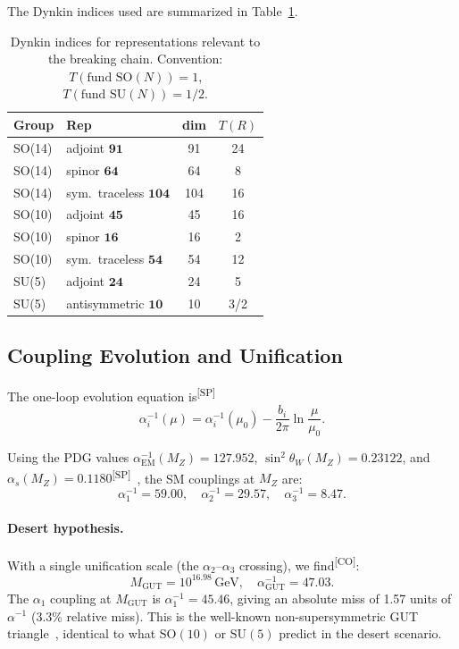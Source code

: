 \documentclass[aps,prd,twocolumn,showpacs,preprintnumbers,superscriptaddress,floatfix]{revtex4-2}
\newcommand{\GeV}{\,\mathrm{GeV}}
\newcommand{\CO}{\textsuperscript{[CO]}}
\newcommand{\SP}{\textsuperscript{[SP]}}
\begin{document}
The Dynkin indices used are summarized in Table~\ref{tab:dynkin}.

\begin{table}[b]
\centering
\caption{Dynkin indices for representations relevant to the breaking chain.
  Convention: $T(\text{fund SO}(N)) = 1$, $T(\text{fund SU}(N)) = 1/2$.}
\label{tab:dynkin}
\small
\begin{tabular}{@{}llcc@{}}
\toprule
\textbf{Group} & \textbf{Rep} & \textbf{dim} & $T(R)$ \\
\midrule
SO(14) & adjoint $\mathbf{91}$ & 91 & 24 \\
SO(14) & spinor $\mathbf{64}$ & 64 & 8 \\
SO(14) & sym.\ traceless $\mathbf{104}$ & 104 & 16 \\
SO(10) & adjoint $\mathbf{45}$ & 45 & 16 \\
SO(10) & spinor $\mathbf{16}$ & 16 & 2 \\
SO(10) & sym.\ traceless $\mathbf{54}$ & 54 & 12 \\
SU(5) & adjoint $\mathbf{24}$ & 24 & 5 \\
SU(5) & antisymmetric $\mathbf{10}$ & 10 & 3/2 \\
\bottomrule
\end{tabular}
\end{table}

\subsection{Coupling Evolution and Unification}

The one-loop evolution equation is\SP
\begin{equation}\label{eq:evolution}
  \alpha_i^{-1}(\mu) = \alpha_i^{-1}(\mu_0)
    - \frac{b_i}{2\pi} \ln\frac{\mu}{\mu_0}.
\end{equation}

Using the PDG values $\alpha_\text{EM}^{-1}(M_Z) = 127.952$,
$\sin^2\theta_W(M_Z) = 0.23122$, and $\alpha_s(M_Z) = 0.1180$\SP\
\cite{pdg2024}, the SM couplings at $M_Z$ are:
\begin{equation}
  \alpha_1^{-1} = 59.00, \quad
  \alpha_2^{-1} = 29.57, \quad
  \alpha_3^{-1} = 8.47.
\end{equation}

\paragraph{Desert hypothesis.}
With a single unification scale (the $\alpha_2$--$\alpha_3$ crossing),
we find\CO:
\begin{equation}\label{eq:desert}
  M_\text{GUT} = 10^{16.98}\GeV, \quad
  \alpha_\text{GUT}^{-1} = 47.03.
\end{equation}
The $\alpha_1$ coupling at $M_\text{GUT}$ is $\alpha_1^{-1} = 45.46$,
giving an absolute miss of 1.57 units of $\alpha^{-1}$ (3.3\% relative
miss).  This is the well-known non-supersymmetric GUT
triangle~\cite{langacker1981}, identical to what $\mathrm{SO}(10)$ or
$\mathrm{SU}(5)$ predict in the desert scenario.
\end{document}
